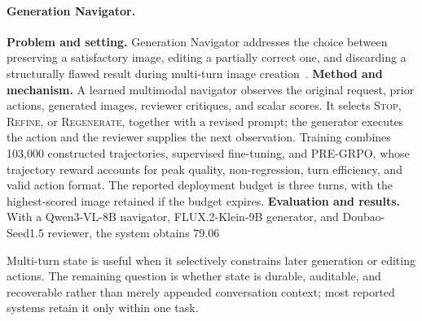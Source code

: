 \paragraph{Generation Navigator.}
\textbf{Problem and setting.} Generation Navigator addresses the choice between preserving a satisfactory image, editing a partially correct one, and discarding a structurally flawed result during multi-turn image creation~\cite{avg260517969}. \textbf{Method and mechanism.} A learned multimodal navigator observes the original request, prior actions, generated images, reviewer critiques, and scalar scores. It selects \textsc{Stop}, \textsc{Refine}, or \textsc{Regenerate}, together with a revised prompt; the generator executes the action and the reviewer supplies the next observation. Training combines 103,000 constructed trajectories, supervised fine-tuning, and PRE-GRPO, whose trajectory reward accounts for peak quality, non-regression, turn efficiency, and valid action format. The reported deployment budget is three turns, with the highest-scored image retained if the budget expires. \textbf{Evaluation and results.} With a Qwen3-VL-8B navigator, FLUX.2-Klein-9B generator, and Doubao-Seed1.5 reviewer, the system obtains 79.06%

Multi-turn state is useful when it selectively constrains later generation or editing actions. The remaining question is whether state is durable, auditable, and recoverable rather than merely appended conversation context; most reported systems retain it only within one task.

